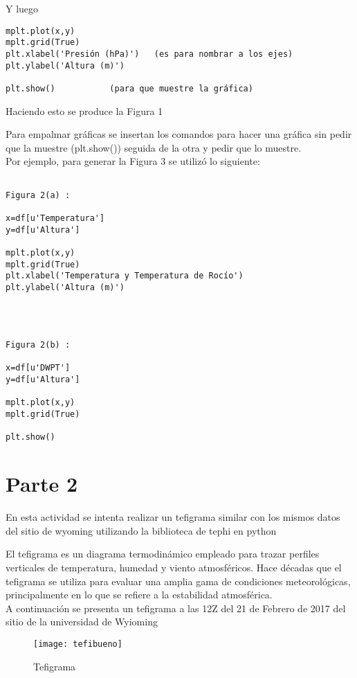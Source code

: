 \documentclass[12pt]{article}
\begin{document}
Y luego
\begin{verbatim}
mplt.plot(x,y)
mplt.grid(True)
plt.xlabel('Presión (hPa)')   (es para nombrar a los ejes)
plt.ylabel('Altura (m)')

plt.show()           (para que muestre la gráfica)

\end{verbatim}

Haciendo esto se produce la Figura 1


Para empalmar gráficas se insertan los comandos para hacer una gráfica sin pedir que la muestre (plt.show()) seguida de la otra y pedir que lo muestre. \\
Por ejemplo, para generar la Figura 3 se utilizó lo siguiente:

\begin{verbatim}

Figura 2(a) :

x=df[u'Temperatura']
y=df[u'Altura']

mplt.plot(x,y)
mplt.grid(True)
plt.xlabel('Temperatura y Temperatura de Rocío')
plt.ylabel('Altura (m)')




Figura 2(b) :

x=df[u'DWPT']
y=df[u'Altura']

mplt.plot(x,y)
mplt.grid(True)

plt.show()
\end{verbatim}

\newpage
\section*{\center Parte 2}


En esta actividad se intenta realizar un tefigrama similar con los mismos datos del sitio de wyoming utilizando la biblioteca de tephi en python


El tefigrama es un diagrama termodinámico empleado para trazar perfiles verticales de temperatura, humedad y viento atmosféricos. Hace décadas que el tefigrama se utiliza para evaluar una amplia gama de condiciones meteorológicas, principalmente en lo que se refiere a la estabilidad atmosférica. \\

A continuación se presenta un tefigrama a las 12Z del 21 de Febrero de 2017 del sitio de la universidad de Wyioming


\begin{figure}[ht]
\texttt{[image: tefibueno]}
\centering
\caption{Tefigrama}
\end{figure}
\end{document}
